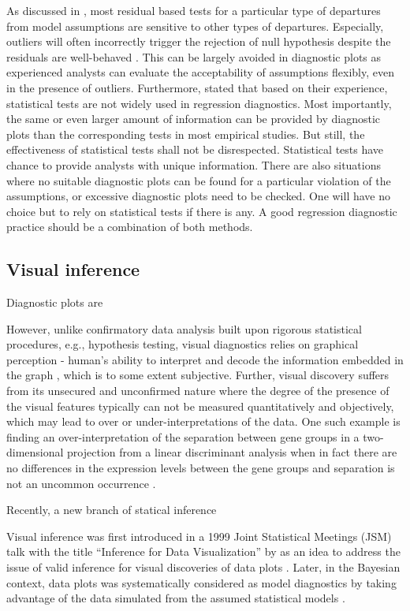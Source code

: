 \documentclass[]{interact}
\theoremstyle{plain}%
\theoremstyle{definition}
\theoremstyle{remark}
\begin{document}
As discussed in \citet{cook1982residuals}, most residual based tests for
a particular type of departures from model assumptions are sensitive to
other types of departures. Especially, outliers will often incorrectly
trigger the rejection of null hypothesis despite the residuals are
well-behaved \citep{cook_applied_1999}. This can be largely avoided in
diagnostic plots as experienced analysts can evaluate the acceptability
of assumptions flexibly, even in the presence of outliers. Furthermore,
\citet{montgomery_introduction_2012} stated that based on their
experience, statistical tests are not widely used in regression
diagnostics. Most importantly, the same or even larger amount of
information can be provided by diagnostic plots than the corresponding
tests in most empirical studies. But still, the effectiveness of
statistical tests shall not be disrespected. Statistical tests have
chance to provide analysts with unique information. There are also
situations where no suitable diagnostic plots can be found for a
particular violation of the assumptions, or excessive diagnostic plots
need to be checked. One will have no choice but to rely on statistical
tests if there is any. A good regression diagnostic practice should be a
combination of both methods.

\hypertarget{visual-inference}{%
\subsection{Visual inference}\label{visual-inference}}

Diagnostic plots are

However, unlike confirmatory data analysis built upon rigorous
statistical procedures, e.g., hypothesis testing, visual diagnostics
relies on graphical perception - human's ability to interpret and decode
the information embedded in the graph \citep{cleveland_graphical_1984},
which is to some extent subjective. Further, visual discovery suffers
from its unsecured and unconfirmed nature where the degree of the
presence of the visual features typically can not be measured
quantitatively and objectively, which may lead to over or
under-interpretations of the data. One such example is finding an
over-interpretation of the separation between gene groups in a
two-dimensional projection from a linear discriminant analysis when in
fact there are no differences in the expression levels between the gene
groups and separation is not an uncommon occurrence
\citep{roy_chowdhury_using_2015}.

Recently, a new branch of statical inference

Visual inference was first introduced in a 1999 Joint Statistical
Meetings (JSM) talk with the title ``Inference for Data Visualization''
by \citet{buja_inference_1999} as an idea to address the issue of valid
inference for visual discoveries of data plots
\citep{gelman_exploratory_2004}. Later, in the Bayesian context, data
plots was systematically considered as model diagnostics by taking
advantage of the data simulated from the assumed statistical models
\citep{gelman_bayesian_2003, gelman_exploratory_2004}.



\end{document}
